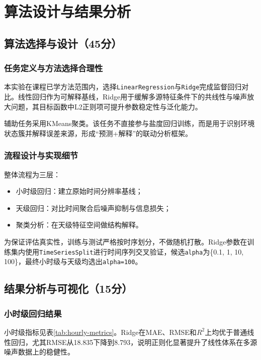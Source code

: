 ﻿\chapter{算法设计与结果分析}

\section{算法选择与设计（45分）}

\subsection{任务定义与方法选择合理性}

本实验在课程已学方法范围内，选择\texttt{LinearRegression}与\texttt{Ridge}完成监督回归对比。线性回归作为可解释基线，Ridge用于缓解多源特征条件下的共线性与噪声放大问题，其目标函数中L2正则项可提升参数稳定性与泛化能力\cite{li_statlearn_2019,scikit_learn_2011}。

辅助任务采用KMeans聚类。该任务不直接参与盐度回归训练，而是用于识别环境状态簇并解释误差来源，形成“预测+解释”的联动分析框架。

\subsection{流程设计与实现细节}

整体流程为三层：
\begin{itemize}
    \item 小时级回归：建立原始时间分辨率基线；
    \item 天级回归：对比时间聚合后噪声抑制与信息损失；
    \item 聚类分析：在天级特征空间做结构解释。
\end{itemize}

为保证评估真实性，训练与测试严格按时序划分，不做随机打散。Ridge参数在训练集内使用\texttt{TimeSeriesSplit}进行时间序列交叉验证，候选\texttt{alpha}为\{0.1, 1, 10, 100\}，最终小时级与天级均选出\texttt{alpha=100}。

\section{结果分析与可视化（15分）}

\subsection{小时级回归结果}

小时级指标见表\ref{tab:hourly-metrics}。Ridge在MAE、RMSE和$R^2$上均优于普通线性回归，尤其RMSE从18.835下降到8.793，说明正则化显著提升了线性体系在多源噪声数据上的稳健性。

